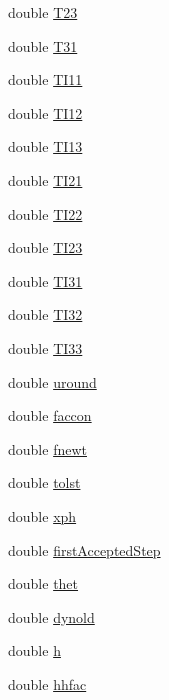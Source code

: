 \begin{DoxyCompactItemize}
double \hyperlink{classodes_1_1Radau5cc_a7a1d50f08a07a822568cbe9d52b75d45}{T23}
\item 
double \hyperlink{classodes_1_1Radau5cc_ab80295b9270d7ac0dde3e7d36dcff866}{T31}
\item 
double \hyperlink{classodes_1_1Radau5cc_a50cc7d8eee62bccf6069a4c1f43d019b}{T\-I11}
\item 
double \hyperlink{classodes_1_1Radau5cc_aaed25bf9d94e2cbbbeed75c093c0406f}{T\-I12}
\item 
double \hyperlink{classodes_1_1Radau5cc_a6da247a0623462bb1d61e5c97d67a39f}{T\-I13}
\item 
double \hyperlink{classodes_1_1Radau5cc_a14b80d1886a7562f3a72ce7acd738272}{T\-I21}
\item 
double \hyperlink{classodes_1_1Radau5cc_a77584ef2a5a6cccef4fe531e95c800d7}{T\-I22}
\item 
double \hyperlink{classodes_1_1Radau5cc_aafd01d1393c2dbe3edc148f073bf24f6}{T\-I23}
\item 
double \hyperlink{classodes_1_1Radau5cc_a0b21d463e63aaa3ae216def4605ed64a}{T\-I31}
\item 
double \hyperlink{classodes_1_1Radau5cc_a6707fd7852c5536fcdc9a85cb78cef5c}{T\-I32}
\item 
double \hyperlink{classodes_1_1Radau5cc_a6641ca56a3e50256303f70f839365c93}{T\-I33}
\item 
double \hyperlink{classodes_1_1Radau5cc_aecb9b0f5b18f8bb94a14435e20bdd65b}{uround}
\item 
double \hyperlink{classodes_1_1Radau5cc_ae3cb85f022d29c80ae8f980e57f1bbf5}{faccon}
\item 
double \hyperlink{classodes_1_1Radau5cc_af6debb655768cb0a251e2886544d87cb}{fnewt}
\item 
double \hyperlink{classodes_1_1Radau5cc_abdf9186a294f8720b8d5100335b6e39a}{tolst}
\item 
double \hyperlink{classodes_1_1Radau5cc_a9f9ba87113cef033764f5282f987a832}{xph}
\item 
double \hyperlink{classodes_1_1Radau5cc_a1a7b580bbae9fcd5c49fa116e877ac5c}{first\-Accepted\-Step}
\item 
double \hyperlink{classodes_1_1Radau5cc_a340c376fb3c4521c3c8e95a7b9911792}{thet}
\item 
double \hyperlink{classodes_1_1Radau5cc_a5d60671c8cf94cc855a57a2afe201565}{dynold}
\item 
double \hyperlink{classodes_1_1Radau5cc_afa3dc089844e77046c958a4ff2dcab1a}{h}
\item 
double \hyperlink{classodes_1_1Radau5cc_ad853d1040e37757aad020edde3b2ec28}{hhfac}

\end{DoxyCompactItemize}
